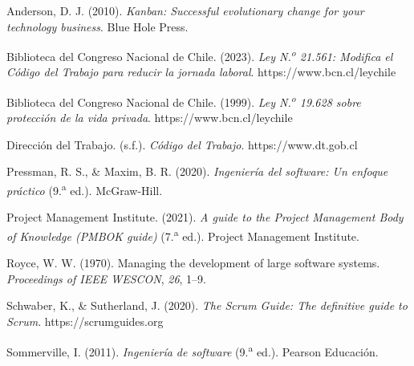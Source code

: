 \documentclass[12pt,letterpaper]{article}
\begin{document}
\begingroup
\setlength{\parindent}{-1.27cm}
\leftskip=1.27cm
\setlength{\parskip}{0.8em}
\sloppy

Anderson, D. J. (2010). \textit{Kanban: Successful evolutionary change for your technology business}. Blue Hole Press.

Biblioteca del Congreso Nacional de Chile. (2023). \textit{Ley N.\textsuperscript{o} 21.561: Modifica el Código del Trabajo para reducir la jornada laboral}. https://www.bcn.cl/leychile

Biblioteca del Congreso Nacional de Chile. (1999). \textit{Ley N.\textsuperscript{o} 19.628 sobre protección de la vida privada}. https://www.bcn.cl/leychile

Dirección del Trabajo. (s.f.). \textit{Código del Trabajo}. https://www.dt.gob.cl

Pressman, R. S., \& Maxim, B. R. (2020). \textit{Ingeniería del software: Un enfoque práctico} (9.\textsuperscript{a} ed.). McGraw-Hill.

Project Management Institute. (2021). \textit{A guide to the Project Management Body of Knowledge (PMBOK guide)} (7.\textsuperscript{a} ed.). Project Management Institute.

Royce, W. W. (1970). Managing the development of large software systems. \textit{Proceedings of IEEE WESCON}, \textit{26}, 1--9.

Schwaber, K., \& Sutherland, J. (2020). \textit{The Scrum Guide: The definitive guide to Scrum}. https://scrumguides.org

Sommerville, I. (2011). \textit{Ingeniería de software} (9.\textsuperscript{a} ed.). Pearson Educación.

\endgroup
\end{document}
